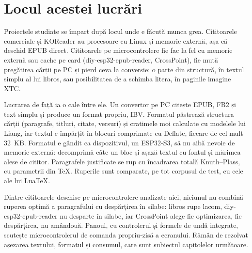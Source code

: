 \section{Locul acestei lucrări}
\label{sec:stadiu-loc}

Proiectele studiate se împart după locul unde e făcută munca grea. Cititoarele
comerciale și KOReader au procesoare cu Linux și memorie externă, așa că
deschid EPUB direct. Cititoarele pe microcontrolere fie fac la fel cu memorie
externă sau cache pe card (diy-esp32-epub-reader, CrossPoint), fie mută
pregătirea cărții pe PC și pierd ceva la conversie: o parte din structură, în textul
simplu al lui libros, sau posibilitatea de a schimba litera, în paginile
imagine XTC.

Lucrarea de față ia o cale între ele. Un convertor pe PC citește EPUB, FB2 și
text simplu și produce un format propriu, IBV. Formatul păstrează structura
cărții (paragrafe, titluri, citate, versuri) și cratimele moi calculate cu
modelele lui Liang, iar textul e împărțit în blocuri comprimate cu Deflate,
fiecare de cel mult 32~KB. Formatul e gândit ca dispozitivul, un ESP32-S3,
să nu aibă nevoie de memorie externă: decomprimă câte un bloc și așază textul cu fontul și mărimea
alese de cititor. Paragrafele justificate se rup cu încadrarea totală
Knuth–Plass, cu parametrii din TeX. Ruperile sunt comparate, pe tot corpusul
de test, cu cele ale lui LuaTeX.

Dintre cititoarele deschise pe microcontrolere analizate aici, niciunul nu
combină ruperea optimă a paragrafului cu despărțirea în silabe: libros rupe
lacom, diy-esp32-epub-reader nu desparte în silabe, iar CrossPoint alege fie
optimizarea, fie despărțirea, nu amândouă. Panoul, cu controlerul și formele
de undă integrate, scutește microcontrolerul de comanda propriu-zisă a
ecranului. Rămân de rezolvat așezarea textului, formatul și consumul, care
sunt subiectul capitolelor următoare.
